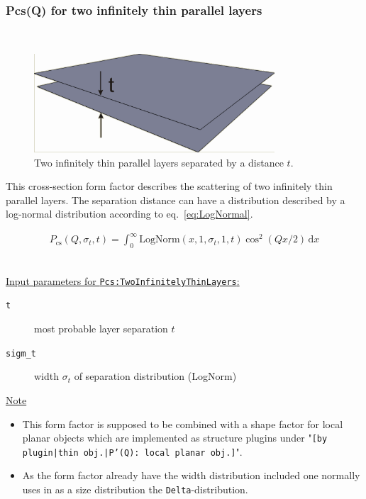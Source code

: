 \clearpage
\subsubsection{Pcs(Q) for two infinitely thin parallel layers} ~\\
\label{plugin:Pcs:TwoInfinitelyThinLayers}

\begin{figure}[htb]
\begin{center}
\includegraphics[width=0.8\textwidth,height=0.328\textwidth]{../images/form_factor/anisotropic/planar2thin_txt.png}
\end{center}
\caption{Two infinitely thin parallel layers separated by a distance $t$.}
\label{fig:Pcs:TwoInfinitelyThinLayers}
\end{figure}

This cross-section form factor describes the scattering of two infinitely thin parallel layers.
The separation distance can have a distribution described by a log-normal distribution according
to eq.\ \ref{eq:LogNormal}.

\begin{align}
P_\text{cs}(Q,\sigma_{t},t) = \int_0^\infty \textrm{LogNorm}(x,1,\sigma_{t},1,t) \cos^2(Qx/2) \, \textrm{d}x
\end{align}

\vspace{5mm}

\hspace{1pt}\\
\underline{Input parameters for \texttt{Pcs:TwoInfinitelyThinLayers}:}
\begin{description}
    \item[\texttt{t}] most probable layer separation $t$
    \item[\texttt{sigm\_t}] width $\sigma_t$ of separation distribution (LogNorm)
\end{description}

\noindent
\underline{Note}
\begin{itemize}
  \item This form factor is supposed to be combined with a shape factor for
local planar objects which are implemented as structure  plugins
under "\texttt{[by plugin|thin obj.|P'(Q): local planar
obj.]}".
\item As the form factor already have the width distribution included one normally uses in \SASfit as a size distribution
the \texttt{Delta}-distribution.
\end{itemize}

